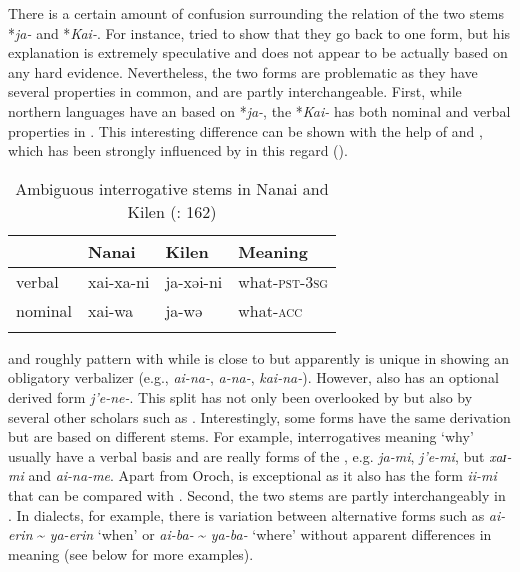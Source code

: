 There is a certain amount of confusion surrounding the relation of the two stems *\textit{ja-} and *\textit{Kai-}. For instance, \citet[27]{Doerfer1985} tried to show that they go back to one form, but his explanation is extremely speculative and does not appear to be actually based on any hard evidence. Nevertheless, the two forms are problematic as they have several properties in common, and are partly interchangeable. First, while northern  languages have an  based on *\textit{ja-}, the  *\textit{Kai-} has both nominal and verbal properties in . This interesting difference can be shown with the help of  and , which has been strongly influenced by  in this regard ().

\begin{table}
\caption{Ambiguous interrogative stems in Nanai \citep{Kazama2007} and Kilen (\citealt{ZhangPaiyu2013}: 162)}
\label{tab:tungu:6}

\begin{tabularx}{\textwidth}{XXXl}
\lsptoprule
& \textbf{Nanai} & \textbf{Kilen} & \textbf{Meaning}\\
\midrule
verbal & xai-xa-ni & ja-xəi-ni & what-\textsc{pst}-3\textsc{sg}\\
nominal & xai-wa & ja-wə & what-\textsc{acc}\\
\lspbottomrule
\end{tabularx}
\end{table}

 and  roughly pattern with  while  is close to  but apparently is unique in showing an obligatory verbalizer (e.g.,  \textit{ai-na-},  \textit{a-na-},  \textit{kai-na-}). However,  also has an optional derived form \textit{j’e-ne-}. This split has not only been overlooked by \citet{Benzing1956} but also by several other scholars such as \citet[99]{TolskayaTolskaya2008}. Interestingly, some forms have the same derivation but are based on different stems. For example, interrogatives meaning ‘why’ usually have a verbal basis and are really  forms of the , e.g.  \textit{ja-mi},  \textit{j’e-mi}, but  \textit{xaɪ-mi} and  \textit{ai-na-me}. Apart from Oroch,  is exceptional as it also has the form \textit{ii-mi} that can be compared with . Second, the two  stems are partly interchangeably in . In  dialects, for example, there is  variation between alternative forms such as \textit{ai-erin} {\textasciitilde} \textit{ya-erin} ‘when’ or \textit{ai-ba-} {\textasciitilde} \textit{ya-ba-} ‘where’ without apparent differences in meaning (see below for more examples).

